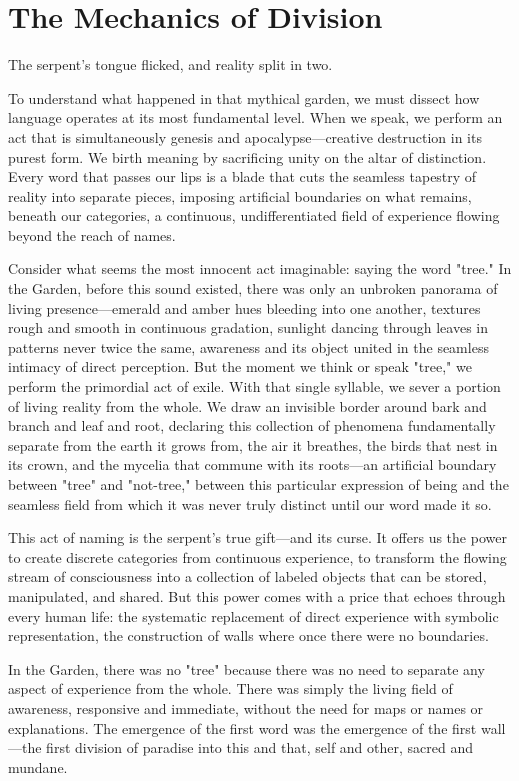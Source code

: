 \section{The Mechanics of Division}

The serpent's tongue flicked, and reality split in two.

To understand what happened in that mythical garden, we must dissect how language operates at its most fundamental level. When we speak, we perform an act that is simultaneously genesis and apocalypse—creative destruction in its purest form. We birth meaning by sacrificing unity on the altar of distinction. Every word that passes our lips is a blade that cuts the seamless tapestry of reality into separate pieces, imposing artificial boundaries on what remains, beneath our categories, a continuous, undifferentiated field of experience flowing beyond the reach of names.

Consider what seems the most innocent act imaginable: saying the word "tree." In the Garden, before this sound existed, there was only an unbroken panorama of living presence—emerald and amber hues bleeding into one another, textures rough and smooth in continuous gradation, sunlight dancing through leaves in patterns never twice the same, awareness and its object united in the seamless intimacy of direct perception. But the moment we think or speak "tree," we perform the primordial act of exile. With that single syllable, we sever a portion of living reality from the whole. We draw an invisible border around bark and branch and leaf and root, declaring this collection of phenomena fundamentally separate from the earth it grows from, the air it breathes, the birds that nest in its crown, and the mycelia that commune with its roots—an artificial boundary between "tree" and "not-tree," between this particular expression of being and the seamless field from which it was never truly distinct until our word made it so.

This act of naming is the serpent's true gift—and its curse. It offers us the power to create discrete categories from continuous experience, to transform the flowing stream of consciousness into a collection of labeled objects that can be stored, manipulated, and shared. But this power comes with a price that echoes through every human life: the systematic replacement of direct experience with symbolic representation, the construction of walls where once there were no boundaries.

In the Garden, there was no "tree" because there was no need to separate any aspect of experience from the whole. There was simply the living field of awareness, responsive and immediate, without the need for maps or names or explanations. The emergence of the first word was the emergence of the first wall—the first division of paradise into this and that, self and other, sacred and mundane.

